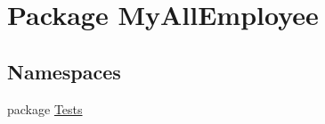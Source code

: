 \hypertarget{namespace_my_all_employee}{}\section{Package My\+All\+Employee}
\label{namespace_my_all_employee}
\subsection*{Namespaces}
\begin{DoxyCompactItemize}
\item 
package \hyperlink{namespace_my_all_employee_1_1_tests}{Tests}
\end{DoxyCompactItemize}
